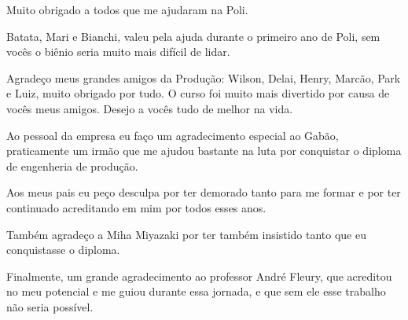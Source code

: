 \begin{agradecimentos}

Muito obrigado a todos que me ajudaram na Poli.
 
Batata, Mari e Bianchi, valeu pela ajuda durante o primeiro ano de Poli, sem vocês o biênio seria muito mais difícil de lidar.

Agradeço meus grandes amigos da Produção: Wilson, Delai, Henry, Marcão, Park e Luiz, muito obrigado por tudo. O curso foi muito mais divertido por causa de vocês meus amigos. Desejo a vocês tudo de melhor na vida.

Ao pessoal da empresa eu faço um agradecimento especial ao Gabão, praticamente um irmão que me ajudou bastante na luta por conquistar o diploma de engenheria de produção. 

Aos meus pais eu peço desculpa por ter demorado tanto para me formar e por ter continuado acreditando em mim por todos esses anos.

Também agradeço a Miha Miyazaki por ter também insistido tanto que eu conquistasse o diploma.

Finalmente, um grande agradecimento ao professor André Fleury, que acreditou no meu potencial e me guiou durante essa jornada, e que sem ele esse trabalho não seria possível.

\end{agradecimentos}